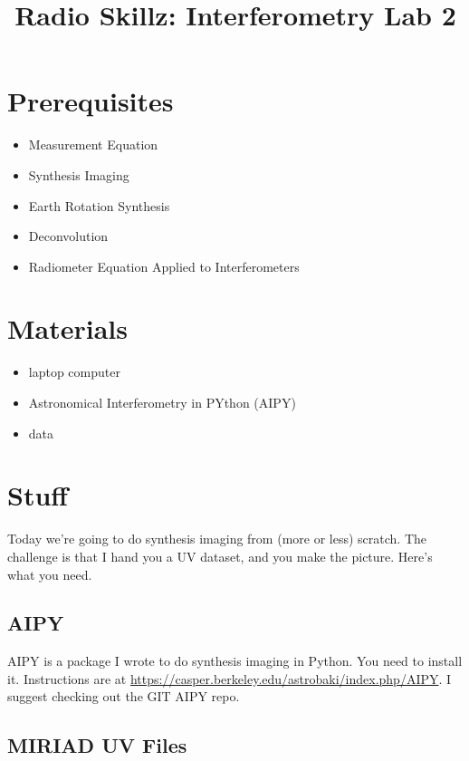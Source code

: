 \documentclass[11pt]{article}
\begin{document}
\title{Radio Skillz: Interferometry Lab 2}

\maketitle

\section*{Prerequisites}

\begin{itemize}
\item Measurement Equation
\item Synthesis Imaging
\item Earth Rotation Synthesis
\item Deconvolution
\item Radiometer Equation Applied to Interferometers
\end{itemize}

\section*{Materials}

\begin{itemize}
\item laptop computer
\item Astronomical Interferometry in PYthon (AIPY)
\item data
\end{itemize}

\section*{Stuff}

Today we're going to do synthesis imaging from (more or less) scratch.  The challenge is
that I hand you a UV dataset, and you make the picture.  Here's what you need.

\subsection*{AIPY}

AIPY is a package I wrote to do synthesis imaging in Python.  You need to install it.  Instructions are
at \url{https://casper.berkeley.edu/astrobaki/index.php/AIPY}.  I suggest checking out the GIT AIPY repo.

\subsection*{MIRIAD UV Files}
\end{document}

